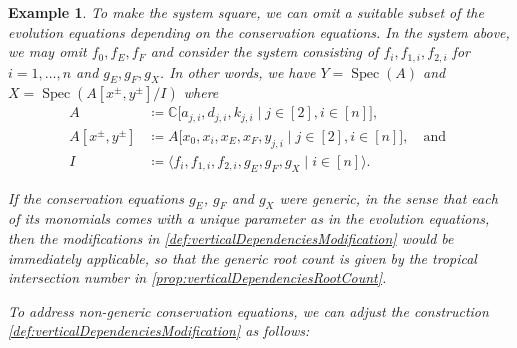 \documentclass[12pt,reqno,a4paper]{amsart}
\theoremstyle{theoremstyle}
\theoremstyle{examplestyle}
\newtheorem{example}[theorem]{Example}
\theoremstyle{algorithmstyle}
\newcommand{\CC}{\mathbb{C}}
\DeclareMathOperator{\Spec}{Spec}
\begin{document}
\begin{example}
  To make the system square, we can omit a suitable subset of the evolution equations depending on the conservation equations. In the system above, we may omit $f_0,f_E,f_F$ and consider the system consisting of $f_i,f_{1,i},f_{2,i}$ for $i=1,\dots,n$ and $g_E,g_F,g_X$.  In other words, we have $Y=\Spec(A)$ and $X=\Spec(A[x^\pm,y^\pm]/I)$ where
  \begin{align*}
    A&\coloneqq \CC\big[a_{j,i},d_{j,i},k_{j,i}\mid j\in[2], i\in [n]\big],\\
    A[x^\pm,y^\pm]&\coloneqq A\big[x_0,x_i,x_E,x_F,y_{j,i}\mid j\in[2], i\in [n]\big], \quad \text{and }\\
    I&\coloneqq \langle f_i,f_{1,i},f_{2,i},g_E,g_F,g_X\mid i\in [n]\rangle.
  \end{align*}

  If the conservation equations $g_{E}$, $g_{F}$ and $g_{X}$ were generic, in the sense that each of its monomials comes with a unique parameter as in the evolution equations, then the modifications in \cref{def:verticalDependenciesModification} would be immediately applicable, so that the generic root count is given by the tropical intersection number in \cref{prop:verticalDependenciesRootCount}.

  To address non-generic conservation equations, we can adjust the construction \cref{def:verticalDependenciesModification} as follows:


\end{example}
\end{document}
